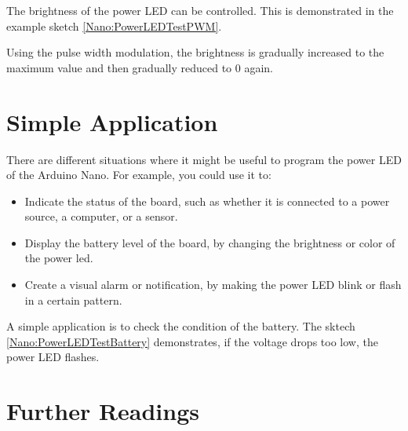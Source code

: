 The brightness of the power LED can be controlled. This is demonstrated in the example sketch \ref{Nano:PowerLEDTestPWM}.

Using the pulse width modulation, the brightness is gradually increased to the maximum value and then gradually reduced to 0 again.




{
    \label{Nano:PowerLEDTestPWM}
}


\section{Simple Application}


There are different situations where it might be useful to program the power LED of the Arduino Nano. For example, you could use it to:

\begin{itemize}
    \item Indicate the status of the board, such as whether it is connected to a power source, a computer, or a sensor.
    \item  Display the battery level of the board, by changing the brightness or color of the power \ac{led}.
    \item Create a visual alarm or notification, by making the power LED blink or flash in a certain pattern.
\end{itemize}

\bigskip

A simple application is to check the condition of the battery. The sktech \ref{Nano:PowerLEDTestBattery} demonstrates, if the voltage drops too low, the power LED flashes.

{
    \label{Nano:PowerLEDTestBattery}
}


\section{Further Readings}



